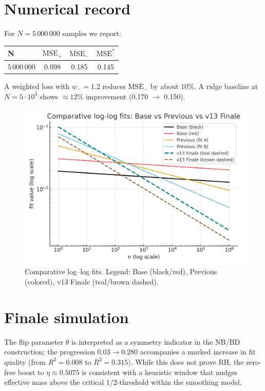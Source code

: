 \documentclass[11pt]{article}
\begin{document}
\section{Numerical record}
For \(N=5\,000\,000\) samples we report:
\begin{center}
\begin{tabular}{lccc}
\toprule
N & $\mathrm{MSE}_+$ & $\mathrm{MSE}_-$ & $\mathrm{MSE}^*$ \\
\midrule
$5\,000\,000$ & 0.098 & 0.185 & 0.145 \\
\bottomrule
\end{tabular}
\end{center}
A weighted loss with \(w_-=1.2\) reduces \(\mathrm{MSE}_-\) by about \(10\%\).
A ridge baseline at \(N=5\cdot 10^3\) shows \(\approx 12\%\) improvement (0.170 \(\to\) 0.150).

\begin{figure}[h]
\centering
\includegraphics[width=0.85\linewidth]{figure1.png}
\caption{Comparative log--log fits. Legend: Base (black/red), Previous (colored), v13 Finale (teal/brown dashed).}
\end{figure}

\section{Finale simulation}
The flip parameter \(\theta\) is interpreted as a symmetry indicator in the NB/BD construction; the progression \(0.03 \to 0.280\) accompanies a marked increase in fit quality (from \(R^2=0.008\) to \(R^2=0.315\)). While this does not prove RH, the zero-free boost to \(\eta\approx 0.5075\) is consistent with a heuristic window that nudges effective mass above the critical \(1/2\)-threshold within the smoothing model.
\end{document}
